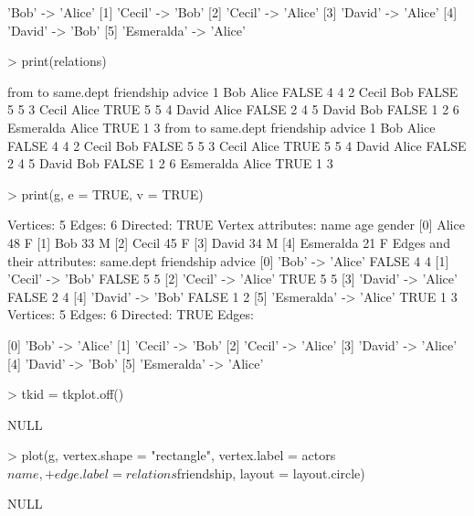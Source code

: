 \documentclass[a4paper,11pt]{scrartcl}
\begin{document}
\begin{Schunk}
\begin{Soutput}
[0] 'Bob'       -> 'Alice'    
[1] 'Cecil'     -> 'Bob'      
[2] 'Cecil'     -> 'Alice'    
[3] 'David'     -> 'Alice'    
[4] 'David'     -> 'Bob'      
[5] 'Esmeralda' -> 'Alice'    
\end{Soutput}
\begin{Sinput}
> print(relations)
\end{Sinput}
\begin{Soutput}
       from    to same.dept friendship advice
1       Bob Alice     FALSE          4      4
2     Cecil   Bob     FALSE          5      5
3     Cecil Alice      TRUE          5      5
4     David Alice     FALSE          2      4
5     David   Bob     FALSE          1      2
6 Esmeralda Alice      TRUE          1      3
       from    to same.dept friendship advice
1       Bob Alice     FALSE          4      4
2     Cecil   Bob     FALSE          5      5
3     Cecil Alice      TRUE          5      5
4     David Alice     FALSE          2      4
5     David   Bob     FALSE          1      2
6 Esmeralda Alice      TRUE          1      3
\end{Soutput}
\begin{Sinput}
> print(g, e = TRUE, v = TRUE)
\end{Sinput}
\begin{Soutput}
Vertices: 5 
Edges: 6 
Directed: TRUE 
Vertex attributes:
         name age gender
[0]     Alice  48      F
[1]       Bob  33      M
[2]     Cecil  45      F
[3]     David  34      M
[4] Esmeralda  21      F
Edges and their attributes:
                               same.dept friendship advice
[0] 'Bob'       -> 'Alice'         FALSE          4      4
[1] 'Cecil'     -> 'Bob'           FALSE          5      5
[2] 'Cecil'     -> 'Alice'          TRUE          5      5
[3] 'David'     -> 'Alice'         FALSE          2      4
[4] 'David'     -> 'Bob'           FALSE          1      2
[5] 'Esmeralda' -> 'Alice'          TRUE          1      3
Vertices: 5 
Edges: 6 
Directed: TRUE 
Edges:
                              
[0] 'Bob'       -> 'Alice'    
[1] 'Cecil'     -> 'Bob'      
[2] 'Cecil'     -> 'Alice'    
[3] 'David'     -> 'Alice'    
[4] 'David'     -> 'Bob'      
[5] 'Esmeralda' -> 'Alice'    
\end{Soutput}
\begin{Sinput}
> tkid = tkplot.off()
\end{Sinput}
\begin{Soutput}
NULL
\end{Soutput}
\begin{Sinput}
> plot(g, vertex.shape = "rectangle", vertex.label = actors$name, 
+     edge.label = relations$friendship, layout = layout.circle)
\end{Sinput}
\begin{Soutput}
NULL
\end{Soutput}
\end{Schunk}
\end{document}
